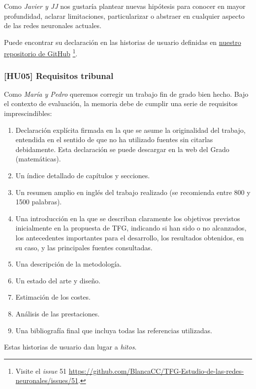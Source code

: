 Como \textit{Javier y JJ} nos gustaría plantear nuevas hipótesis para conocer en mayor profundidad, 
aclarar limitaciones, particularizar o abstraer en cualquier aspecto de las redes neuronales actuales.

Puede encontrar su declaración en las historias de usuario definidas en \href{https://github.com/BlancaCC/TFG-Estudio-de-las-redes-neuronales}{nuestro repositorio 
de GitHub} \footnote{Visite el \textit{issue} 51 \url{https://github.com/BlancaCC/TFG-Estudio-de-las-redes-neuronales/issues/51}.}.


\subsubsection*{[HU05] Requisitos tribunal} \label{HUO6}
Como \textit{María y Pedro} queremos corregir un trabajo fin de grado bien hecho. 
Bajo el contexto de evaluación, la memoria debe de cumplir una serie de requisitos imprescindibles:

\begin{enumerate}
    \item Declaración explícita firmada en la que se asume la originalidad del trabajo, entendida en el sentido de que no ha utilizado fuentes sin citarlas debidamente. Esta declaración se puede descargar en la web del Grado (matemáticas).
    \item Un índice detallado de capítulos y secciones.
    \item Un resumen amplio en inglés del trabajo realizado (se recomienda entre 800 y 1500 palabras).
    \item Una introducción en la que se describan claramente los objetivos previstos inicialmente en la propuesta de TFG, indicando si han sido o no alcanzados, los antecedentes importantes para el desarrollo, los resultados obtenidos, en su caso, y las principales fuentes consultadas.
    \item Una descripción de la metodología.
    \item Un estado del arte y diseño.
    \item Estimación de los costes.
    \item Análisis de las prestaciones.
    \item Una bibliografía final que incluya todas las referencias utilizadas.
\end{enumerate}


Estas historias de usuario dan lugar a \textit{hitos}. 

